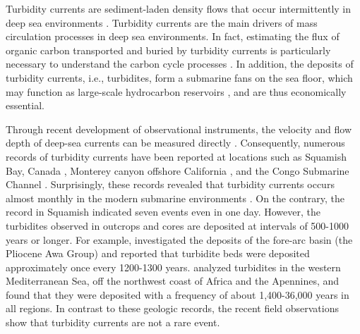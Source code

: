 
Turbidity currents are sediment-laden density flows that occur intermittently in deep sea environments \citep{Talling2014}. Turbidity currents are the main drivers of mass circulation processes in deep sea environments. In fact, estimating the flux of organic carbon transported and buried by turbidity currents is particularly necessary to understand the carbon cycle processes \citep{Buscail1997,Heussner1999}. In addition, the deposits of turbidity currents, i.e., turbidites, form a submarine fans on the sea floor, which may function as large-scale hydrocarbon reservoirs \citep{Kendrick1998,Yoneda2015}, and are thus economically essential.

Through recent development of observational instruments, the velocity and flow depth of deep-sea currents can be measured directly \citep{Clarke2016}. Consequently, numerous records of turbidity currents have been reported at locations such as Squamish Bay, Canada \citep{Clarke2016}, Monterey canyon offshore California \citep{xu2004insitu,xu2010normalized,Paull2018}, and the Congo Submarine Channel \citep{vangriesheim2009turbidity,azpiroz2017newly}. Surprisingly, these records revealed that turbidity currents occurs almost monthly in the modern submarine environments \citep{Paull2018}. On the contrary, the record in Squamish indicated seven events even in one day. However, the turbidites observed in outcrops and cores are deposited at intervals of 500-1000 years or longer. For example, \citet{Ishihara1997} investigated the deposits of the fore-arc basin (the Pliocene Awa Group) and reported that turbidite beds were deposited approximately once every 1200-1300 years. \citet{Clare2014} analyzed turbidites in the western Mediterranean Sea, off the northwest coast of Africa and the Apennines, and found that they were deposited with a frequency of about 1,400-36,000 years in all regions. In contrast to these geologic records, the recent field observations show that turbidity currents are not a rare event.

